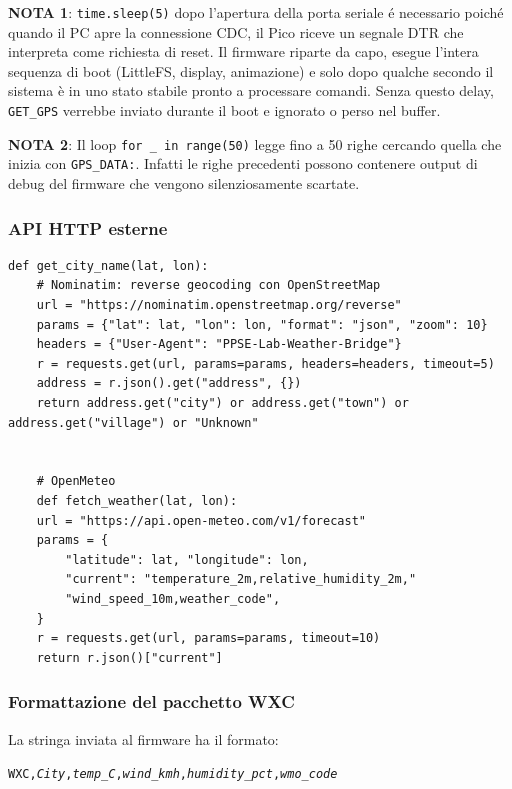 \textbf{NOTA 1}: \texttt{time.sleep(5)} dopo l'apertura della porta seriale é necessario poiché
quando il PC apre la connessione CDC, il Pico riceve un segnale DTR che interpreta come richiesta di reset. Il firmware riparte da capo, esegue l'intera sequenza di boot (LittleFS, display, animazione) e solo dopo
qualche secondo il sistema è in uno stato stabile pronto a processare comandi.
Senza questo delay, \texttt{GET\_GPS} verrebbe inviato durante il boot e
ignorato o perso nel buffer.


\textbf{NOTA 2}: Il loop \texttt{for \_ in range(50)} legge fino a 50 righe cercando quella
che inizia con \texttt{GPS\_DATA:}. Infatti le righe precedenti possono contenere
output di debug del firmware che vengono silenziosamente scartate. 

\subsubsection*{API HTTP esterne}

\begin{lstlisting}[style=py, caption={pcb\_bridge.py --- geocoding e meteo}]
	def get_city_name(lat, lon):
	# Nominatim: reverse geocoding con OpenStreetMap
	url = "https://nominatim.openstreetmap.org/reverse"
	params = {"lat": lat, "lon": lon, "format": "json", "zoom": 10}
	headers = {"User-Agent": "PPSE-Lab-Weather-Bridge"}
	r = requests.get(url, params=params, headers=headers, timeout=5)
	address = r.json().get("address", {})
	return address.get("city") or address.get("town") or address.get("village") or "Unknown"
	
	
	# OpenMeteo
	def fetch_weather(lat, lon):
	url = "https://api.open-meteo.com/v1/forecast"
	params = {
		"latitude": lat, "longitude": lon,
		"current": "temperature_2m,relative_humidity_2m,"
		"wind_speed_10m,weather_code",
	}
	r = requests.get(url, params=params, timeout=10)
	return r.json()["current"]
\end{lstlisting}


\subsubsection*{Formattazione del pacchetto WXC}

La stringa inviata al firmware ha il formato:
\begin{center}
	\texttt{WXC,\textit{City},\textit{temp\_C},\textit{wind\_kmh},\textit{humidity\_pct},\textit{wmo\_code}}
\end{center}


